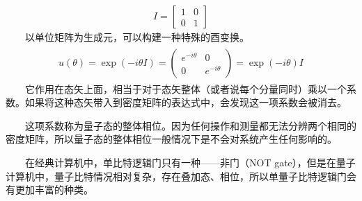 \documentclass[a4paper,11pt,english]{sphinxmanual}
\begin{document}
\sphinxAtStartPar
{}
\begin{equation*}
\begin{split}I=\left[\begin{array}{ll} 1 & 0 \\ 0 & 1 \end{array}\right]\end{split}
\end{equation*}
\sphinxAtStartPar
  以单位矩阵为生成元，可以构建一种特殊的酉变换。
\begin{equation*}
\begin{split}\begin{array}{cc} u(\theta)=\exp (-i \theta I)=\left(\begin{array}{cc} e^{-i \theta} & 0 \\ 0 & e^{-i \theta} \end{array}\right)=\exp (-i \theta) I \end{array}\end{split}
\end{equation*}
\sphinxAtStartPar
  它作用在态矢上面，相当于对于态矢整体（或者说每个分量同时）乘以一个系数。如果将这种态矢带入到密度矩阵的表达式中，会发现这一项系数会被消去。

\sphinxAtStartPar
  这项系数称为量子态的整体相位。因为任何操作和测量都无法分辨两个相同的密度矩阵，所以量子态的整体相位一般情况下是不会对系统产生任何影响的。

\sphinxAtStartPar
{}

\sphinxAtStartPar
  在经典计算机中，单比特逻辑门只有一种——非门（NOT gate），但是在量子计算机中，量子比特情况相对复杂，存在叠加态、相位，所以单量子比特逻辑门会有更加丰富的种类。

\sphinxAtStartPar
{}
\end{document}

